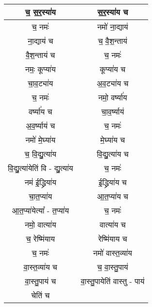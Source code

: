 {\begin{longtable}{|c|c|}
\hline
च॒ स॒र॒स्या॑य                 & स॒र॒स्या॑य च\\
\hline
च॒ नमः॑                    & नमो॑ ना॒द्याय॑\\
\hline
ना॒द्याय॑ च                 & च॒ वै॒श॒न्ताय॑\\
\hline
वै॒श॒न्ताय॑ च                 & च॒ नमः॑\\
\hline
नमः॒ कूप्या॑य                & कूप्या॑य च\\
\hline
चा॒व॒ट्या॑य                  & अ॒व॒ट्या॑य च\\
\hline
च॒ नमः॑                    & नमो॒ वर्ष्या॑य\\
\hline
वर्ष्या॑य च                 & चा॒व॒र्ष्याय॑\\
\hline
अ॒व॒र्ष्याय॑ च                & च॒ नमः॑\\
\hline
नमो॑ मे॒घ्या॑य                & मे॒घ्या॑य च\\
\hline
च॒ वि॒द्यु॒त्या॑य               & वि॒द्यु॒त्या॑य च\\
\hline
वि॒द्यु॒त्या॑येति॑ वि - द्यु॒त्या॑य   & च॒ नमः॑\\
\hline
नम॑ ई॒द्ध्रिया॑य              & ई॒द्ध्रिया॑य च\\
\hline
चा॒त॒प्या॑य                  & आ॒त॒प्या॑य च\\
\hline
आ॒त॒प्या॑येत्या᳚ - त॒प्या॑य        & च॒ नमः॑\\
\hline
नमो॒ वात्या॑य               & वात्या॑य च\\
\hline
च॒ रेष्मि॑याय                & रेष्मि॑याय च\\
\hline
च॒ नमः॑                    & नमो॑ वास्त॒व्या॑य\\
\hline
वा॒स्त॒व्या॑य च               & च॒ वा॒स्तु॒पाय॑\\
\hline
वा॒स्तु॒पाय॑ च                & वा॒स्तु॒पायेति॑ वास्तु - पाय॑\\
\hline
चेति॑ च                    & \\
\hline
\end{longtable}
}
